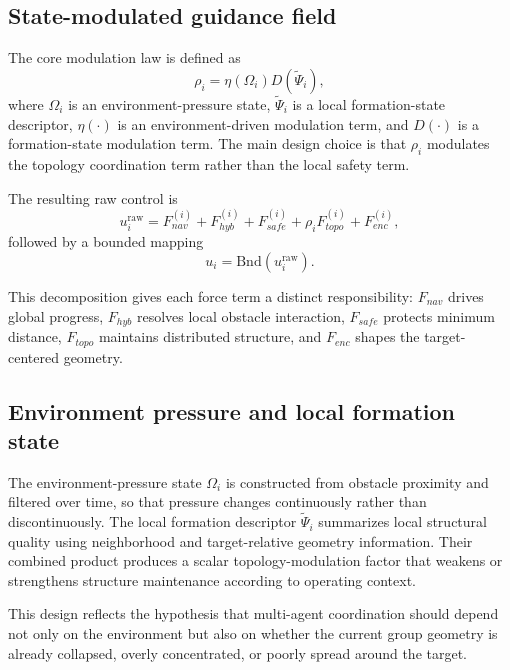 \documentclass[utf8]{FrontiersinHarvard}
\begin{document}
\subsection{State-modulated guidance field}

The core modulation law is defined as
\begin{equation}
\rho_i = \eta(\Omega_i) D(\tilde{\Psi}_i),
\end{equation}
where $\Omega_i$ is an environment-pressure state, $\tilde{\Psi}_i$ is a local formation-state descriptor, $\eta(\cdot)$ is an environment-driven modulation term, and $D(\cdot)$ is a formation-state modulation term. The main design choice is that $\rho_i$ modulates the topology coordination term rather than the local safety term.

The resulting raw control is
\begin{equation}
u_i^{\mathrm{raw}} = F_{nav}^{(i)} + F_{hyb}^{(i)} + F_{safe}^{(i)} + \rho_i F_{topo}^{(i)} + F_{enc}^{(i)},
\end{equation}
followed by a bounded mapping
\begin{equation}
u_i = \mathrm{Bnd}(u_i^{\mathrm{raw}}).
\end{equation}

This decomposition gives each force term a distinct responsibility: $F_{nav}$ drives global progress, $F_{hyb}$ resolves local obstacle interaction, $F_{safe}$ protects minimum distance, $F_{topo}$ maintains distributed structure, and $F_{enc}$ shapes the target-centered geometry.

\subsection{Environment pressure and local formation state}

The environment-pressure state $\Omega_i$ is constructed from obstacle proximity and filtered over time, so that pressure changes continuously rather than discontinuously. The local formation descriptor $\tilde{\Psi}_i$ summarizes local structural quality using neighborhood and target-relative geometry information. Their combined product produces a scalar topology-modulation factor that weakens or strengthens structure maintenance according to operating context.

This design reflects the hypothesis that multi-agent coordination should depend not only on the environment but also on whether the current group geometry is already collapsed, overly concentrated, or poorly spread around the target.
\end{document}
